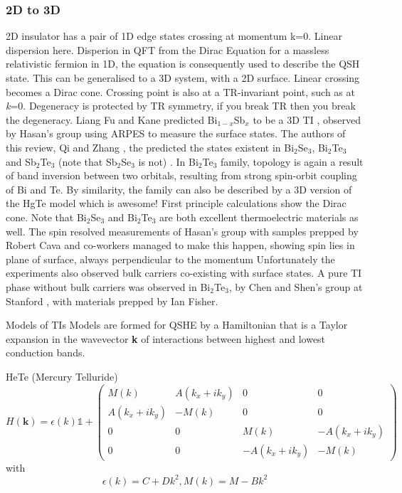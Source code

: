 \documentclass{article} %
\newcommand{\bismuthselinide}[1]{Bi$_2$Se$_3$#1}
\newcommand{\bismuthtelluride}[1]{Bi$_2$Te$_3$#1}
\newcommand{\antimonyselenide}[1]{Sb$_2$Se$_3$#1}
\newcommand{\antimonytelluride}[1]{Sb$_2$Te$_3$#1}
\begin{document}
	\subsubsection{2D to 3D}
		\begin{outline}	
			\1 2D insulator has a pair of 1D edge states crossing at momentum k=0. Linear dispersion here. Disperion in QFT from the Dirac Equation for a massless relativistic fermion in 1D, the equation is consequently used to describe the QSH state.
			\1 This can be generalised to a 3D system, with a 2D surface. Linear crossing becomes a Dirac cone. Crossing point is also at a TR-invariant point, such as at \textit{k}=0. Degeneracy is protected by TR symmetry, if you break TR then you break the degeneracy. 
			\1 Liang Fu and Kane predicted Bi$_{1-x}$Sb$_x$ to be a 3D TI \cite{fu_topological_2007}, observed by Hasan's group \cite{hsieh_topological_2008} using ARPES to measure the surface states.
			The authors of this review, Qi and Zhang \cite{qi_quantum_2010}, the predicted the states existent in \bismuthselinide{}, \bismuthtelluride{} and \antimonytelluride{} (note that \antimonyselenide{} is not) \cite{zhang_topological_2009}.
				\2 In \bismuthtelluride{} family, topology is again a result of band inversion between two orbitals, resulting from strong spin-orbit coupling of Bi and Te. By similarity, the family can also be described by a 3D version of the HgTe model which is awesome! 
				\2 First principle calculations show the Dirac cone.
				\2 Note that \bismuthselinide{} and \bismuthtelluride{} are both excellent thermoelectric materials as well.
				\2 The spin resolved measurements of Hasan's group with samples prepped by Robert Cava and co-workers managed to make this happen, showing spin lies in plane of surface, always perpendicular to the momentum 
				\2 Unfortunately the experiments also observed bulk carriers co-existing with surface states.
				\2 A pure TI phase without bulk carriers was observed in \bismuthtelluride{}, by Chen and Shen's group at Stanford \cite{chen_experimental_2009}, with materials prepped by Ian Fisher.
				
			\1 Models of TIs
				\2 Models are formed for QSHE by a Hamiltonian that is a Taylor expansion in the wavevector \textbf{k} of interactions between highest and lowest conduction bands.
				
				\3 HeTe (Mercury Telluride)
				\begin{equation}
					H(\textbf{k}) = \epsilon(k)\mathds{1} + \left(
						\begin{matrix}
							M(k) & A(k_x+ik_y) & 0 & 0\\
							A(k_x+ik_y) & -M(k) & 0 & 0\\
							0 & 0 & M(k) & -A(k_x+ik_y)\\
							0 & 0 & -A(k_x+ik_y) & -M(k)
						\end{matrix}
					\right)
				\end{equation}
				with \begin{equation}
					\epsilon(k)=C+Dk^2, M(k) = M - Bk^2
				\end{equation}
				

\end{outline}
\end{document}
